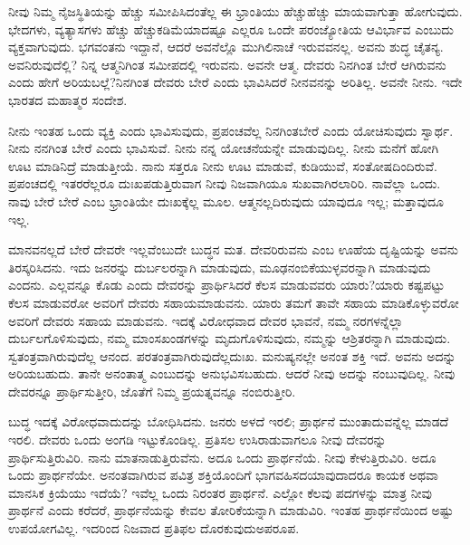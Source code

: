 \vskip 0.1cm

ನೀವು ನಿಮ್ಮ ನೈಜಸ್ಥಿತಿಯನ್ನು ಹೆಚ್ಚು ಸಮೀಪಿಸಿದಂತೆಲ್ಲ ಈ ಭ್ರಾಂತಿಯು ಹೆಚ್ಚು\break ಹೆಚ್ಚು ಮಾಯವಾಗುತ್ತಾ ಹೋಗುವುದು. ಭೇದಗಳು, ವ್ಯತ್ಯಾಸಗಳು ಹೆಚ್ಚು ಹೆಚ್ಚು\break ಕಡಿಮೆಯಾದಷ್ಟೂ ಎಲ್ಲರೂ ಒಂದೇ ಪರಂಜ್ಯೋತಿಯ ಆವಿರ್ಭಾವ ಎಂಬುದು ವ್ಯಕ್ತವಾಗುವುದು. ಭಗವಂತನು ಇದ್ದಾನೆ, ಆದರೆ ಅವನೆಲ್ಲೊ ಮುಗಿಲಿನಾಚೆ ಇರುವವನಲ್ಲ. ಅವನು ಶುದ್ಧ ಚೈತನ್ಯ. ಅವನಿರುವುದೆಲ್ಲಿ? ನಿನ್ನ ಆತ್ಮನಿಗಿಂತ ಸಮೀಪದಲ್ಲಿ ಇರುವನು. ಅವನೇ ಆತ್ಮ. ದೇವರು ನಿನಗಿಂತ ಬೇರೆ ಆಗಿರುವನು ಎಂದು ಹೇಗೆ ಅರಿಯಬಲ್ಲೆ?\break ನಿನಗಿಂತ ದೇವರು ಬೇರೆ ಎಂದು ಭಾವಿಸಿದರೆ ನೀನವನನ್ನು ಅರಿತಿಲ್ಲ. ಅವನೇ ನೀನು. ಇದೇ ಭಾರತದ ಮಹಾತ್ಮರ ಸಂದೇಶ.

\vskip 0.1cm

ನೀನು ಇಂತಹ ಒಂದು ವ್ಯಕ್ತಿ ಎಂದು ಭಾವಿಸುವುದು, ಪ್ರಪಂಚವೆಲ್ಲ ನಿನಗಿಂತ\break ಬೇರೆ ಎಂದು ಯೋಚಿಸುವುದು ಸ್ವಾರ್ಥ. ನೀನು ನನಗಿಂತ ಬೇರೆ ಎಂದು ಭಾವಿಸುವೆ. ನೀನು ನನ್ನ ಯೋಚನೆಯನ್ನೇ ಮಾಡುವುದಿಲ್ಲ. ನೀನು ಮನೆಗೆ ಹೋಗಿ ಊಟ ಮಾಡಿ\break ನಿದ್ರೆ ಮಾಡುತ್ತೀಯೆ. ನಾನು ಸತ್ತರೂ ನೀನು ಊಟ ಮಾಡುವೆ, ಕುಡಿಯುವೆ, ಸಂತೋಷದಿಂದಿರುವೆ. ಪ್ರಪಂಚದಲ್ಲಿ ಇತರರೆಲ್ಲರೂ ದುಃಖಪಡುತ್ತಿರುವಾಗ ನೀವು ನಿಜವಾಗಿಯೂ ಸುಖವಾಗಿರಲಾರಿರಿ. ನಾವೆಲ್ಲಾ ಒಂದು. ನಾವು ಬೇರೆ ಬೇರೆ ಎಂಬ ಭ್ರಾಂತಿಯೇ ದುಃಖಕ್ಕೆಲ್ಲ ಮೂಲ. ಆತ್ಮನಲ್ಲದಿರುವುದು ಯಾವುದೂ ಇಲ್ಲ; ಮತ್ತಾವುದೂ ಇಲ್ಲ.

\vskip 0.1cm

ಮಾನವನಲ್ಲದೆ ಬೇರೆ ದೇವರೇ ಇಲ್ಲವೆಂಬುದೇ ಬುದ್ಧನ ಮತ. ದೇವರಿರುವನು ಎಂಬ ಊಹೆಯ ದೃಷ್ಟಿಯನ್ನು ಅವನು ತಿರಸ್ಕರಿಸಿದನು. ಇದು ಜನರನ್ನು ದುರ್ಬಲರನ್ನಾಗಿ ಮಾಡುವುದು, ಮೂಢನಂಬಿಕೆಯುಳ್ಳವರನ್ನಾಗಿ ಮಾಡುವುದು ಎಂದನು. ಎಲ್ಲವನ್ನೂ ಕೊಡು ಎಂದು ದೇವರನ್ನು ಪ್ರಾರ್ಥಿಸಿದರೆ ಕೆಲಸ ಮಾಡುವವರು ಯಾರು?\break ಯಾರು ಕಷ್ಟಪಟ್ಟು ಕೆಲಸ ಮಾಡುವರೋ ಅವರಿಗೆ ದೇವರು ಸಹಾಯಮಾಡುವನು. ಯಾರು ತಮಗೆ ತಾವೇ ಸಹಾಯ ಮಾಡಿಕೊಳ್ಳುವರೋ ಅವರಿಗೆ ದೇವರು ಸಹಾಯ ಮಾಡುವನು. ಇದಕ್ಕೆ ವಿರೋಧವಾದ ದೇವರ ಭಾವನೆ, ನಮ್ಮ ನರಗಳನ್ನೆಲ್ಲಾ ದುರ್ಬಲಗೊಳಿಸುವುದು, ನಮ್ಮ ಮಾಂಸಖಂಡಗಳನ್ನು ಮೃದುಗೊಳಿಸುವುದು, ನಮ್ಮನ್ನು ಆಶ್ರಿತರನ್ನಾಗಿ ಮಾಡುವುದು. ಸ್ವತಂತ್ರವಾಗಿರುವುದೆಲ್ಲ ಆನಂದ. ಪರತಂತ್ರವಾಗಿರುವುದೆಲ್ಲ\break ದುಃಖ. ಮನುಷ್ಯನಲ್ಲೇ ಅನಂತ ಶಕ್ತಿ ಇದೆ. ಅವನು ಅದನ್ನು ಅರಿಯಬಹುದು. ತಾನೇ ಅನಂತಾತ್ಮ ಎಂಬುದನ್ನು ಅನುಭವಿಸಬಹುದು. ಆದರೆ ನೀವು ಅದನ್ನು ನಂಬುವುದಿಲ್ಲ. ನೀವು ದೇವರನ್ನೂ ಪ್ರಾರ್ಥಿಸುತ್ತೀರಿ, ಜೊತೆಗೆ ನಿಮ್ಮ ಪ್ರಯತ್ನವನ್ನೂ ನಂಬಿರುತ್ತೀರಿ.

\vskip 0.1cm

ಬುದ್ಧ ಇದಕ್ಕೆ ವಿರೋಧವಾದುದನ್ನು ಬೋಧಿಸಿದನು. ಜನರು ಅಳದೆ ಇರಲಿ; ಪ್ರಾರ್ಥನೆ ಮುಂತಾದುವನ್ನೆಲ್ಲ ಮಾಡದೆ ಇರಲಿ. ದೇವರು ಒಂದು ಅಂಗಡಿ ಇಟ್ಟು\-ಕೊಂಡಿಲ್ಲ. ಪ್ರತಿಸಲ ಉಸಿರಾಡುವಾಗಲೂ ನೀವು ದೇವರನ್ನು ಪ್ರಾರ್ಥಿಸುತ್ತಿರುವಿರಿ. ನಾನು ಮಾತನಾಡುತ್ತಿರುವೆನು. ಅದೂ ಒಂದು ಪ್ರಾರ್ಥನೆಯೆ. ನೀವು ಕೇಳುತ್ತಿರುವಿರಿ. ಅದೂ ಒಂದು ಪ್ರಾರ್ಥನೆಯೇ. ಅನಂತವಾಗಿರುವ ಪವಿತ್ರ ಶಕ್ತಿಯೊಂದಿಗೆ ಭಾಗವಹಿಸದ\break ಯಾವುದಾದರೂ ಕಾಯಕ ಅಥವಾ ಮಾನಸಿಕ ಕ್ರಿಯೆಯು ಇದೆಯೆ? ಇವೆಲ್ಲ ಒಂದು ನಿರಂತರ ಪ್ರಾರ್ಥನೆ. ಎಲ್ಲೋ ಕೆಲವು ಪದಗಳನ್ನು ಮಾತ್ರ ನೀವು ಪ್ರಾರ್ಥನೆ ಎಂದು ಕರೆದರೆ, ಪ್ರಾರ್ಥನೆಯನ್ನು ಕೇವಲ ತೋರಿಕೆಯನ್ನಾಗಿ ಮಾಡುವಿರಿ. ಇಂತಹ ಪ್ರಾರ್ಥನೆಯಿಂದ ಅಷ್ಟು ಉಪಯೋಗವಿಲ್ಲ. ಇದರಿಂದ ನಿಜವಾದ ಪ್ರತಿಫಲ ದೊರಕುವುದು\break ಅಪರೂಪ.

